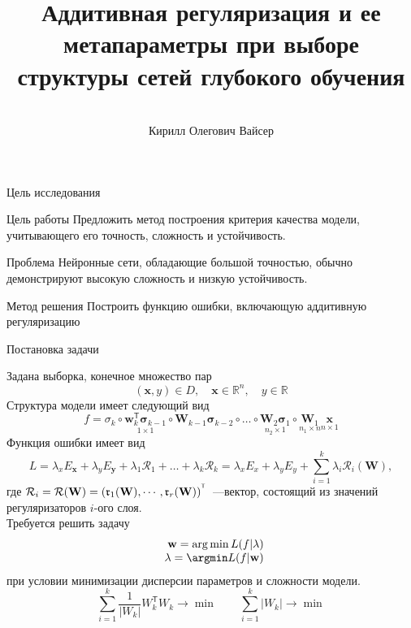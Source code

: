 \documentclass[9pt,pdf,hyperref={unicode}]{beamer}
\title[\hbox to 56mm{Аддитивная регуляризация  \hfill\insertframenumber\,/\,\inserttotalframenumber}]
{Аддитивная регуляризация и ее метапараметры при выборе структуры сетей глубокого обучения}
\author[К.\,О. Вайсер ]{\large \\Кирилл Олегович Вайсер}
\institute{\large
Московский физико-технический институт}
\date{\footnotesize{\emph{Курс:} Численные методы обучения по прецедентам\par (практика, В.\,В. Стрижов)/Группа 774, весна 2020}\\\footnotesize{\emph{Консультант:} аспирант М.\ С. Потанин}\\
\footnotesize{\emph{Научный руководитель:} д.ф.-м.н. В.\ В. Стрижов}}
\newcommand{\rk}{\mathfrak{r}}
\newcommand{\sigmab}{{\boldsymbol{\sigma}}}
\newcommand{\T}{^{\text{\tiny\sffamily\upshape\mdseries T}}}
\newcommand{\x}{{\mathbf{x}}}
\newcommand{\y}{{\mathbf{y}}}
\newcommand{\w}{{\mathbf{W}}}
\newcommand{\wm}{{\mathbf{w}}}
\begin{document}
\begin{frame}
\titlepage
\end{frame}
\begin{frame}{Цель исследования}
\begin{block}{Цель работы}
Предложить метод построения критерия качества модели, учитывающего его точность, сложность и устойчивость.
\end{block}
\begin{block}{Проблема}
Нейронные сети, обладающие большой точностью, обычно демонстрируют высокую сложность и низкую устойчивость.
\end{block}
\begin{block}{Метод решения}
Построить функцию ошибки, включающую аддитивную регуляризацию
\end{block}
\end{frame}
\begin{frame}{Постановка задачи}

Задана выборка, конечное множество пар  $$
(\mathbf{x},y) \in D,\quad \mathbf{x} \in \mathbb{R}^{n},\quad y\in \mathbb{R}
$$
Структура модели имеет следующий вид
\begin{equation}
f = \sigma_k\circ\underset{1\times1}{\wm_k^\mathsf{T}\sigmab_{k-1}}\circ\w_{k-1}\sigmab_{k-2}\circ\dots\circ\underset{n_2 \times 1}{\w_2\sigmab_1}\circ\underset{n_1 \times n}{\w_1}\underset{n \times 1}{\x}
\end{equation}
Функция ошибки имеет вид
\begin{equation}\label{eq:error_function}
L = \lambda_xE_{\mathbf{x}} + \lambda_yE_{\y} + \lambda_1\mathcal{R}_1+\dots+\lambda_k\mathcal{R}_k = \lambda_xE_x + \lambda_yE_y + \sum\limits_{i = 1}^k\mathbb{\lambda}_i \mathcal{R}_i(\mathbf{W}),
\end{equation}
где $\mathcal{R}_i = \mathcal{R}(\mathbf{W}) = (\rk_1(\mathbf{W}), \cdots , \rk_r(\mathbf{W}))^{\T}$~---вектор, состоящий из значений регуляризаторов $i$-ого слоя.
\\ Требуется решить задачу
\begin{equation}\label{eq:criterion_argmin}
\begin{array}{r@{}l}
\wm= \arg \min L(f| \mathbf{\lambda})\\
\mathbf{\lambda }= \argmin L(f| \wm) \\
\end{array}
\end{equation}
при условии минимизации дисперсии параметров и сложности модели.
\begin{equation}
    \sum\limits_{i=1}^k \frac{1}{|W_k|}W_k^\mathsf{T}W_k \rightarrow \min \quad \quad
    \sum\limits_{i=1}^k |W_k| \rightarrow \min
\end{equation}
\end{frame}
\end{document}
